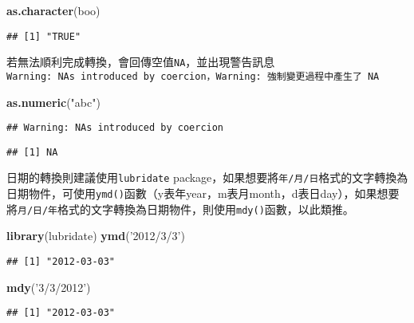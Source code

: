 \documentclass[]{book}
\newenvironment{Shaded}{\begin{snugshade}}{\end{snugshade}}
\newcommand{\KeywordTok}[1]{\textcolor[rgb]{0.13,0.29,0.53}{\textbf{{#1}}}}
\newcommand{\StringTok}[1]{\textcolor[rgb]{0.31,0.60,0.02}{{#1}}}
\newcommand{\NormalTok}[1]{{#1}}
\begin{document}
\begin{Shaded}
\begin{Highlighting}[]
\KeywordTok{as.character}\NormalTok{(boo)}
\end{Highlighting}
\end{Shaded}

\begin{verbatim}
## [1] "TRUE"
\end{verbatim}

若無法順利完成轉換，會回傳空值\texttt{NA}，並出現警告訊息\texttt{Warning:\ NAs\ introduced\ by\ coercion，Warning:\ 強制變更過程中產生了\ NA}

\begin{Shaded}
\begin{Highlighting}[]
\KeywordTok{as.numeric}\NormalTok{(}\StringTok{"abc"}\NormalTok{)}
\end{Highlighting}
\end{Shaded}

\begin{verbatim}
## Warning: NAs introduced by coercion
\end{verbatim}

\begin{verbatim}
## [1] NA
\end{verbatim}

日期的轉換則建議使用\texttt{lubridate}\citep{R-lubridate}
package，如果想要將\texttt{年/月/日}格式的文字轉換為日期物件，可使用\texttt{ymd()}函數（y表年year，m表月month，d表日day），如果想要將\texttt{月/日/年}格式的文字轉換為日期物件，則使用\texttt{mdy()}函數，以此類推。

\begin{Shaded}
\begin{Highlighting}[]
\KeywordTok{library}\NormalTok{(lubridate)}
\KeywordTok{ymd}\NormalTok{(}\StringTok{'2012/3/3'}\NormalTok{)}
\end{Highlighting}
\end{Shaded}

\begin{verbatim}
## [1] "2012-03-03"
\end{verbatim}

\begin{Shaded}
\begin{Highlighting}[]
\KeywordTok{mdy}\NormalTok{(}\StringTok{'3/3/2012'}\NormalTok{)}
\end{Highlighting}
\end{Shaded}

\begin{verbatim}
## [1] "2012-03-03"
\end{verbatim}
\end{document}
